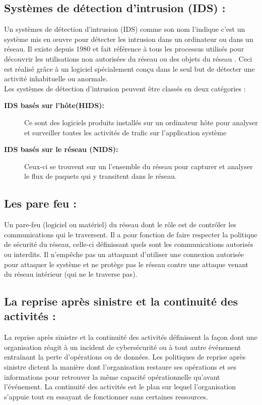 \subsection{Systèmes de détection d'intrusion (IDS) :}
Un systèmes de détection d’intrusion (IDS) comme son nom l'indique c'est un système mis en œuvre pour détecter les intrusion dans un ordinateur ou dans un réseau. 
Il existe depuis 1980 \cite{refids} et fait référence à tous les processus utilisés pour découvrir les utilisations non autorisées du réseau ou des objets du réseau . Ceci est réalisé grâce à un logiciel spécialement conçu dans le seul but de détecter une activité inhabituelle ou anormale.\\

Les systèmes de détection d'intrusion peuvent être classés en deux catégories \cite{refidsd}:
\begin{description}
\item[ \textbf{IDS basés sur l'hôte(HIDS): }]Ce sont des logiciels
produits installés sur un ordinateur hôte pour analyser et surveiller toutes les activités de  trafic    sur   l'application   système
\item[\textbf{IDS basés sur le réseau (NIDS): }]Ceux-ci se trouvent sur un l'ensemble du réseau pour capturer et analyser le flux de
paquets qui y transitent dans le réseau.
\end{description}
\subsection{Les pare feu : }
Un pare-feu (logiciel ou matériel) du réseau dont le rôle est de contrôler les communications qui le traversent. Il a pour fonction de faire respecter la politique de sécurité du réseau, celle-ci définissant quels sont les communications autorisés ou interdits. Il n'empêche pas un attaquant d'utiliser une connexion autorisée pour attaquer le système et ne protège pas le réseau contre une attaque venant du réseau intérieur (qui ne le traverse pas).
\subsection{La reprise après sinistre et la continuité des activités : }
La reprise après sinistre et la continuité des activités définissent la façon dont une organisation réagit à un incident de cybersécurité ou à tout autre événement entraînant la perte d'opérations ou de données. Les politiques de reprise après sinistre dictent la manière dont l'organisation restaure ses opérations et ses informations pour retrouver la même capacité opérationnelle qu'avant l'événement. La continuité des activités est le plan sur lequel l'organisation s'appuie tout en essayant de fonctionner sans certaines ressources.
